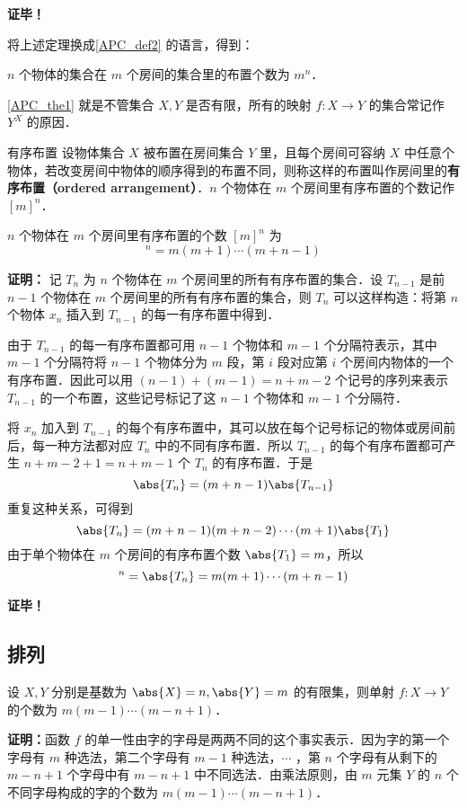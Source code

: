 \textbf{证毕！}

将上述定理换成\autoref{APC_def2} 的语言，得到：
\begin{theorem}{}
$n$ 个物体的集合在 $m$ 个房间的集合里的布置个数为 $m^n$．
\end{theorem}

\autoref{APC_the1} 就是不管集合 $X,Y$ 是否有限，所有的映射 $f:X\rightarrow Y$ 的集合常记作 $Y^X$ 的原因．

\begin{definition}{有序布置}
设物体集合 $X$ 被布置在房间集合 $Y$ 里，且每个房间可容纳 $X$ 中任意个物体，若改变房间中物体的顺序得到的布置不同，则称这样的布置叫作房间里的\textbf{有序布置（ordered arrangement）}．$n$ 个物体在 $m$ 个房间里有序布置的个数记作 $[m]^n$．
\end{definition}
\begin{theorem}{}
$n$ 个物体在 $m$ 个房间里有序布置的个数 $[m]^n$ 为
\begin{equation}
[m]^n=m(m+1)\cdots(m+n-1)
\end{equation}
\end{theorem}
\textbf{证明：}
记 $T_n$ 为 $n$ 个物体在 $m$ 个房间里的所有有序布置的集合．设 $T_{n-1}$ 是前 $n-1$ 个物体在 $m$ 个房间里的所有有序布置的集合，则 $T_n$ 可以这样构造：将第 $n$ 个物体 $x_n$ 插入到 $T_{n-1}$ 的每一有序布置中得到．

由于 $T_{n-1}$ 的每一有序布置都可用 $n-1$ 个物体和 $m-1$ 个分隔符表示，其中 $m-1$ 个分隔符将 $n-1$ 个物体分为 $m$ 段，第 $i$ 段对应第 $i$ 个房间内物体的一个有序布置．因此可以用 $(n-1)+(m-1)=n+m-2$ 个记号的序列来表示 $T_{n-1}$ 的一个布置，这些记号标记了这 $n-1$ 个物体和 $m-1$ 个分隔符． 

将 $x_n$ 加入到 $T_{n-1}$ 的每个有序布置中，其可以放在每个记号标记的物体或房间前后，每一种方法都对应 $T_{n}$ 中的不同有序布置．所以 $T_{n-1}$ 的每个有序布置都可产生 $n+m-2+1=n+m-1$ 个 $T_n$ 的有序布置．于是
\begin{equation}
\abs{T_n}=(m+n-1)\abs{T_{n-1}}
\end{equation}
重复这种关系，可得到
\begin{equation}
\abs{T_n}=(m+n-1)(m+n-2)\cdots (m+1)\abs{T_1}
\end{equation}
由于单个物体在 $m$ 个房间的有序布置个数 $\abs{T_1}=m$，所以
\begin{equation}
[m]^n=\abs{T_n}=m(m+1)\cdots(m+n-1)
\end{equation}

\textbf{证毕！}
\subsection{排列}
\begin{theorem}{}
设 $X,Y$ 分别是基数为 $\abs{X}=n,\abs{Y}=m$ 的有限集，则单射 $f:X\rightarrow Y$ 的个数为 $m(m-1)\cdots(m-n+1)$．
\end{theorem}
\textbf{证明：}函数 $f$ 的单一性由字的字母是两两不同的这个事实表示．因为字的第一个字母有 $m$ 种选法，第二个字母有 $m-1$ 种选法，$\cdots$ ，第 $n$ 个字母有从剩下的 $m-n+1$ 个字母中有 $m-n+1$ 中不同选法．由乘法原则，由 $m$ 元集 $Y$ 的 $n$ 个不同字母构成的字的个数为 $m(m-1)\cdots(m-n+1)$．

